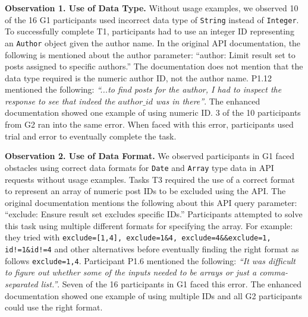 \textbf{Observation 1. Use of Data Type.} Without usage examples, we observed 10 of the 16 G1 participants used incorrect data type of \lstinline{String} instead of \lstinline{Integer}. To successfully complete T1, participants had to use an integer ID representing an \lstinline{Author} object given the author name. In the original API documentation, the following is mentioned about the author parameter: ``author: Limit result set to posts assigned to specific authors.'' The documentation does not mention that the data type required is the numeric author ID, not the author name. P1.12 mentioned the following: \textit{``...to find posts for the author, I had to inspect the response to see that indeed the $author\_id$ was in there''}. The enhanced documentation showed one example of using numeric ID. 3 of the 10 participants from G2 ran into the same error. When faced with this error, participants used trial and error to eventually complete the task.

\vspace{10mm}
\hspace{-5mm}
\vspace{10mm}

\textbf{Observation 2. Use of Data Format.} We observed participants in G1 faced obstacles using correct data formats for \lstinline{Date} and \lstinline{Array} type data in API requests without usage examples. Tasks T3 required the use of a correct format to represent an array of numeric post IDs to be excluded using the API. The original documentation mentions the following about this API query parameter: ``exclude: Ensure result set excludes specific IDs.'' Participants attempted to solve this task using multiple different formats for specifying the array. For example: they tried with \lstinline{exclude=[1,4], exclude=1&4, exclude=4&&exclude=1, id!=1&id!=4} and other alternatives before eventually finding the right format as follows \lstinline{exclude=1,4}. Participant P1.6 mentioned the following: \textit{``It was difficult to figure out whether some of the inputs needed to be arrays or just a comma-separated list.''}. Seven of the 16 participants in G1 faced this error. The enhanced documentation showed one example of using multiple IDs and all G2 participants could use the right format.

